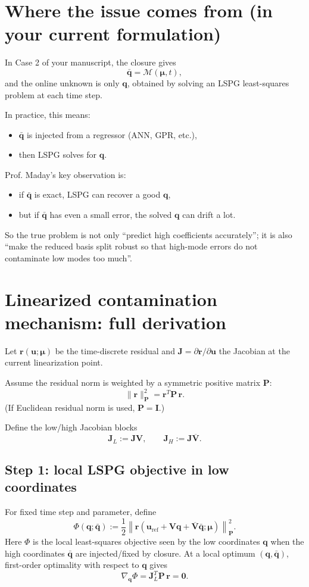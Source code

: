 \documentclass[11pt]{article}
\begin{document}
\section{Where the issue comes from (in your current formulation)}
In Case 2 of your manuscript, the closure gives
\[
\bar{\mathbf q}=\mathcal M(\bm\mu,t),
\]
and the online unknown is only $\mathbf q$, obtained by solving an LSPG least-squares problem at each time step.

In practice, this means:
\begin{itemize}[leftmargin=1.5em]
\item $\bar{\mathbf q}$ is injected from a regressor (ANN, GPR, etc.),
\item then LSPG solves for $\mathbf q$.
\end{itemize}

Prof. Maday's key observation is:
\begin{itemize}[leftmargin=1.5em]
\item if $\bar{\mathbf q}$ is exact, LSPG can recover a good $\mathbf q$,
\item but if $\bar{\mathbf q}$ has even a small error, the solved $\mathbf q$ can drift a lot.
\end{itemize}

So the true problem is not only ``predict high coefficients accurately''; it is also ``make the reduced basis split robust so that high-mode errors do not contaminate low modes too much''.

\section{Linearized contamination mechanism: full derivation}
Let $\mathbf r(\mathbf u;\bm\mu)$ be the time-discrete residual and $\mathbf J=\partial \mathbf r/\partial \mathbf u$ the Jacobian at the current linearization point.

Assume the residual norm is weighted by a symmetric positive matrix $\mathbf P$:
\[
\|\mathbf r\|_{\mathbf P}^2=\mathbf r^T\mathbf P\,\mathbf r.
\]
(If Euclidean residual norm is used, $\mathbf P=\mathbf I$.)

Define the low/high Jacobian blocks
\[
\mathbf J_L:=\mathbf J\mathbf V,
\qquad
\mathbf J_H:=\mathbf J\overline{\mathbf V}.
\]

\subsection*{Step 1: local LSPG objective in low coordinates}
For fixed time step and parameter, define
\[
\Phi(\mathbf q;\bar{\mathbf q})
:=
\frac12\left\|
\mathbf r\!\left(
\mathbf u_{\mathrm{ref}}+\mathbf V\mathbf q+\overline{\mathbf V}\bar{\mathbf q}
;\bm\mu\right)
\right\|_{\mathbf P}^2.
\]
Here $\Phi$ is the local least-squares objective seen by the low coordinates $\mathbf q$ when the high coordinates $\bar{\mathbf q}$ are injected/fixed by closure.
At a local optimum $(\mathbf q,\bar{\mathbf q})$, first-order optimality with respect to $\mathbf q$ gives
\[
\nabla_{\mathbf q}\Phi
=
\mathbf J_L^T\mathbf P\,\mathbf r
=
\mathbf0.
\]
\end{document}
